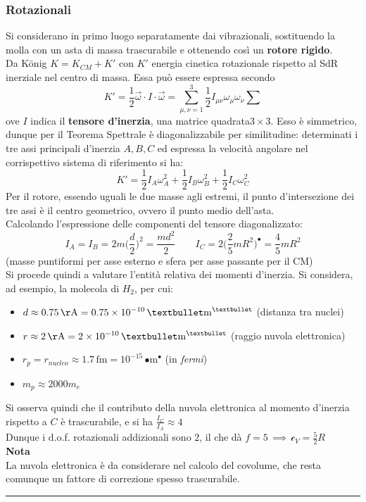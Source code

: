 \documentclass[10pt, oneside]{book}
\newcommand{\angstrom}{\, \mathrm{\AA}}
\newcommand{\meters}[2]{\, \mathrm{#1 m^{#2}}}
\newcommand{\infobox}[2]{\vspace{0.5cm}~\\ \textbf{#1} \hrulefill \vspace{0.2cm}\\#2 {}\,\\\hrule \vspace{0.5cm}}
\newcommand{\ds}{\displaystyle}
\newcommand{\molhtv}{\mathcal{c}_V }
\begin{document}
\subsubsection*{Rotazionali}
Si considerano in primo luogo separatamente dai vibrazionali, sostituendo la molla con un asta di massa trascurabile e ottenendo così un \textbf{rotore rigido}.\\
Da K\"onig $\ds K = K_{CM} + K'$ con $K'$ energia cinetica rotazionale rispetto al SdR inerziale nel centro di massa. Essa può essere espressa secondo
\[K' = \frac{1}{2} \vec{\omega} \cdot I \cdot \vec{\omega} = \sum\limits_{\mu, \nu =1}^3 \frac{1}{2} I_{\mu \nu} \omega_\mu \omega_\nu  \sum\]
ove $I$ indica il \textbf{tensore d'inerzia}, una matrice quadrata$3 \times 3$. Esso è simmetrico, dunque per il Teorema Spettrale è diagonalizzabile per similitudine: determinati i tre assi principali d'inerzia $A,B,C$ ed espressa la velocità angolare nel corrispettivo sistema di riferimento si ha:
\[K' = \frac{1}{2}I_A \omega_A^2 + \frac{1}{2}I_B \omega_B^2 + \frac{1}{2}I_C \omega_C^2\]
Per il rotore, essendo uguali le due masse agli estremi, il punto d'intersezione dei tre assi è il centro geometrico, ovvero il punto medio dell'asta. \\
Calcolando l'espressione delle componenti del tensore diagonalizzato:
\[I_A = I_B = 2 m \bigg(\frac{d}{2}\bigg)^2 = \frac{md^2}{2} \quad \quad I_C = 2 \bigg(\frac{2}{5}mR^2\bigg)^{•} = \frac{4}{5}mR^2\]
(masse puntiformi per asse esterno e sfera per asse passante per il CM)
\\
Si procede quindi a valutare l'entità relativa dei momenti d'inerzia. Si considera, ad esempio, la molecola di $H_2$, per cui:
\begin{itemize}
\item $\ds d \approx 0.75 \angstrom = 0.75 \times 10^{-10} \meters{•}{•}$ (distanza tra nuclei)
\item $\ds r \approx 2 \angstrom = 2 \times 10^{-10} \meters{•}{•}$ (raggio nuvola elettronica)
\item $\ds r_p = r_{nucleo} \approx 1.7 \, \mathrm{fm} = 10^{-15} \meters{•}{•}$ (in \textit{fermi})
\item $\ds m_p \approx 2000 m_e$
\end{itemize}
Si osserva quindi che il contributo della nuvola elettronica al momento d'inerzia rispetto a $C$ è trascurabile, e si ha $\ds \frac{I_C}{I_A} \approx 4$\textperthousand\\
Dunque i d.o.f. rotazionali addizionali sono $2$, il che dà $f= 5 \, \implies \, \molhtv = \frac{5}{2}R$
\infobox{Nota}{La nuvola elettronica è da considerare nel calcolo del covolume, che resta comunque un fattore di correzione spesso trascurabile.}
\end{document}
